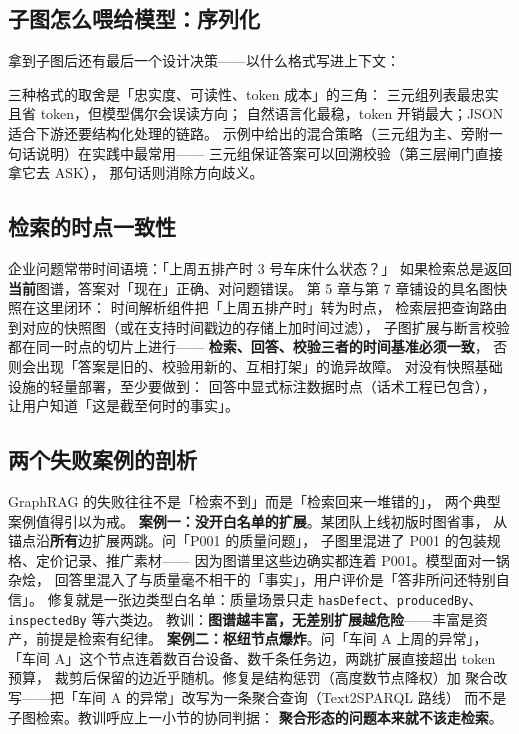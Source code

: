 \subsection{子图怎么喂给模型：序列化}

拿到子图后还有最后一个设计决策——以什么格式写进上下文：



三种格式的取舍是「忠实度、可读性、token 成本」的三角：
三元组列表最忠实且省 token，但模型偶尔会误读方向；
自然语言化最稳，token 开销最大；JSON 适合下游还要结构化处理的链路。
示例中给出的混合策略（三元组为主、旁附一句话说明）在实践中最常用——
三元组保证答案可以回溯校验（第三层闸门直接拿它去 ASK），
那句话则消除方向歧义。

\subsection{检索的时点一致性}

企业问题常带时间语境：「上周五排产时 3 号车床什么状态？」
如果检索总是返回\textbf{当前}图谱，答案对「现在」正确、对问题错误。
第 5 章与第 7 章铺设的具名图快照在这里闭环：
时间解析组件把「上周五排产时」转为时点，
检索层把查询路由到对应的快照图（或在支持时间戳边的存储上加时间过滤），
子图扩展与断言校验都在同一时点的切片上进行——
\textbf{检索、回答、校验三者的时间基准必须一致}，
否则会出现「答案是旧的、校验用新的、互相打架」的诡异故障。
对没有快照基础设施的轻量部署，至少要做到：
回答中显式标注数据时点（话术工程已包含），
让用户知道「这是截至何时的事实」。

\subsection{两个失败案例的剖析}

GraphRAG 的失败往往不是「检索不到」而是「检索回来一堆错的」，
两个典型案例值得引以为戒。
\textbf{案例一：没开白名单的扩展}。某团队上线初版时图省事，
从锚点沿\textbf{所有}边扩展两跳。问「P001 的质量问题」，
子图里混进了 P001 的包装规格、定价记录、推广素材——
因为图谱里这些边确实都连着 P001。模型面对一锅杂烩，
回答里混入了与质量毫不相干的「事实」，用户评价是「答非所问还特别自信」。
修复就是一张边类型白名单：质量场景只走
\texttt{hasDefect}、\texttt{producedBy}、\texttt{inspectedBy} 等六类边。
教训：\textbf{图谱越丰富，无差别扩展越危险}——丰富是资产，前提是检索有纪律。
\textbf{案例二：枢纽节点爆炸}。问「车间 A 上周的异常」，
「车间 A」这个节点连着数百台设备、数千条任务边，两跳扩展直接超出 token 预算，
裁剪后保留的边近乎随机。修复是结构惩罚（高度数节点降权）加
聚合改写——把「车间 A 的异常」改写为一条聚合查询（Text2SPARQL 路线）
而不是子图检索。教训呼应上一小节的协同判据：
\textbf{聚合形态的问题本来就不该走检索}。

